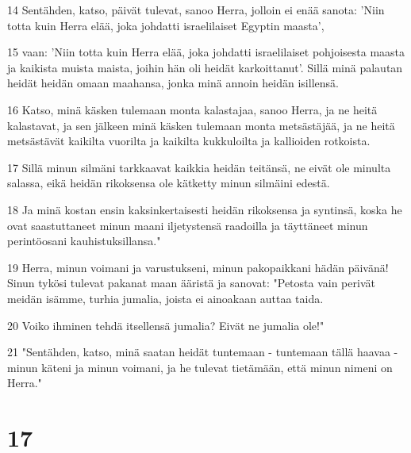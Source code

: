 \par 14 Sentähden, katso, päivät tulevat, sanoo Herra, jolloin ei enää sanota: 'Niin totta kuin Herra elää, joka johdatti israelilaiset Egyptin maasta',
\par 15 vaan: 'Niin totta kuin Herra elää, joka johdatti israelilaiset pohjoisesta maasta ja kaikista muista maista, joihin hän oli heidät karkoittanut'. Sillä minä palautan heidät heidän omaan maahansa, jonka minä annoin heidän isillensä.
\par 16 Katso, minä käsken tulemaan monta kalastajaa, sanoo Herra, ja ne heitä kalastavat, ja sen jälkeen minä käsken tulemaan monta metsästäjää, ja ne heitä metsästävät kaikilta vuorilta ja kaikilta kukkuloilta ja kallioiden rotkoista.
\par 17 Sillä minun silmäni tarkkaavat kaikkia heidän teitänsä, ne eivät ole minulta salassa, eikä heidän rikoksensa ole kätketty minun silmäini edestä.
\par 18 Ja minä kostan ensin kaksinkertaisesti heidän rikoksensa ja syntinsä, koska he ovat saastuttaneet minun maani iljetystensä raadoilla ja täyttäneet minun perintöosani kauhistuksillansa."
\par 19 Herra, minun voimani ja varustukseni, minun pakopaikkani hädän päivänä! Sinun tykösi tulevat pakanat maan ääristä ja sanovat: "Petosta vain perivät meidän isämme, turhia jumalia, joista ei ainoakaan auttaa taida.
\par 20 Voiko ihminen tehdä itsellensä jumalia? Eivät ne jumalia ole!"
\par 21 "Sentähden, katso, minä saatan heidät tuntemaan - tuntemaan tällä haavaa - minun käteni ja minun voimani, ja he tulevat tietämään, että minun nimeni on Herra."

\chapter{17}

